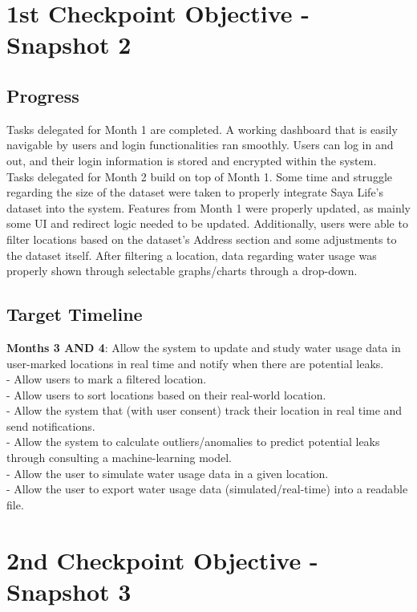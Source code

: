 \documentclass[10pt]{article}
\begin{document}
\newpage

\section*{1st Checkpoint Objective - Snapshot 2}
\subsection*{Progress}
Tasks delegated for Month 1 are completed. A working dashboard that is easily navigable by users and login functionalities ran smoothly. Users can log in and out, and their login information is stored and encrypted within the system.\\
Tasks delegated for Month 2 build on top of Month 1. Some time and struggle regarding the size of the dataset were taken to properly integrate Saya Life's dataset into the system. Features from Month 1 were properly updated, as mainly some UI and redirect logic needed to be updated. Additionally, users were able to filter locations based on the dataset's Address section and some adjustments to the dataset itself. After filtering a location, data regarding water usage was properly shown through selectable graphs/charts through a drop-down. 
\subsection*{Target Timeline}
\textbf{Months 3 AND 4}: Allow the system to update and study water usage data in user-marked locations in real time and notify when there are potential leaks.\\
- Allow users to mark a filtered location.\\
- Allow users to sort locations based on their real-world location.\\
- Allow the system that (with user consent) track their location in real time and send notifications.\\
- Allow the system to calculate outliers/anomalies to predict potential leaks through consulting a machine-learning model.\\
- Allow the user to simulate water usage data in a given location.\\
- Allow the user to export water usage data (simulated/real-time) into a readable file.

\newpage

\section*{2nd Checkpoint Objective - Snapshot 3}
\end{document}
